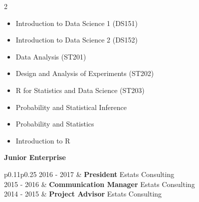 \documentclass[10pt,a4paper,withhyper]{altacv}
\begin{document}
\begin{paracol}{2}


\divider \smallskip


\newpage


\begin{itemize}
    \item Introduction to Data Science 1 (DS151)
    \item Introduction to Data Science 2 (DS152)
    \item Data Analysis (ST201)
    \item Design and Analysis of Experiments (ST202)
    \item R for Statistics and Data Science (ST203)
\end{itemize}

\divider
{}
\begin{itemize}
    \item Probability and Statistical Inference
    \item Probability and Statistics
\end{itemize}

\divider
{}
\begin{itemize}
    \item Introduction to R
\end{itemize}


{\large {} \textbf{Junior Enterprise}}

\begin{tabular}{{p{0.11\textwidth}p{0.25\textwidth}}}
	2016 - 2017 & \textbf{President} \newline
	Estats Consulting \\
	2015 - 2016 & \textbf{Communication Manager} \newline
	Estats Consulting \\
	2014 - 2015 & \textbf{Project Advisor} \newline
	Estats Consulting \\
\end{tabular}

\end{paracol}
\end{document}
